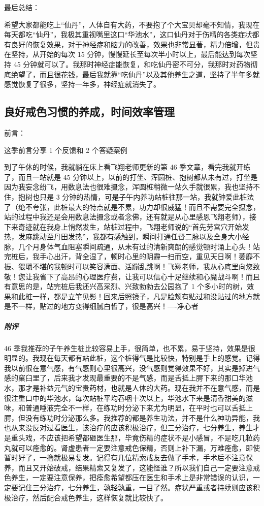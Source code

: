 最后总结：

希望大家都能吃上“仙丹”，人体自有大药，不要抱了个大宝贝却毫不知情，我现在每天都吃“仙丹”，我极其重视嘴里这口“华池水”，这口仙丹对于伤精的各类症状都有良好的恢复效果，对于神经症和脑力的改善，效果也非常显著，精力倍增，但贵在坚持，从开始的每次 15 分钟，慢慢延长至每次半小时以上，最后能达到每次坚持 45 分钟就可以了。我那时神经症能恢复，和吃仙丹密不可分，我那时对药物彻底绝望了，而且很花钱，最后我就靠“吃仙丹”以及其他养生之道，坚持了半年多就感觉恢复了很多，坚持一年多，神经症就消失了。

\subsection{良好戒色习惯的养成，时间效率管理}

前言：

这季前言分享 1 个反馈和 2 个答疑案例

\begin{case}
    到了午休的时候，我就躺在床上看飞翔老师更新的第 46 季文章，看完我就开练了，而且一站就是 45 分钟以上，以前的打坐、浑圆桩、抱树都从未有过，打坐是因为我妄念纷飞，用数息法也很难摄念，浑圆桩稍微一站久手就很累，我也坚持不住，抱树也只是 3 分钟的热情，可是子午内养功站桩往那一站，我就钟爱此桩法了（绝不夸张，此桩最大的特点就是不累，功力却很威猛！而且不需要完全摄念，站的过程中我还是会用数息法摄念或者念佛，还有就是从心里感恩飞翔老师），接下来奇迹就在我身上悄然发生，站桩过程中，飞翔老师说的“首先劳宫穴开始发热，发麻跳动至丹田发热”，我都有感触到，瞬间打通任督二脉以及全身大小经脉，几个月身体气血阻塞瞬间疏通，从未有过的清新爽朗的感觉顿时涌上心头！站完桩后，我手心出汗，背全湿了，顿时心里的阴霾一扫而空，重见天日啊！萎靡不振、猥琐不堪的我顿时可以笑容满面、活蹦乱跳啊！飞翔老师，我从心底里向您致敬！您让我省下了高昂的心理医疗费，让我可以信心十足继续和心魔战斗啊！而且有意思的是，站完桩后我还兴高采烈、兴致勃勃去公园抱了 1 个多小时的树，效果和此桩一样，都是立竿见影！回来后照镜子，凡是脸颊有贴过和没贴过的地方就是不一样，贴过的地方变得细腻白皙了，很是高兴！----净心者
    \subparagraph{附评} 46 季我推荐的子午养生桩比较容易上手，很简单，也不累，易于坚持，效果是很明显的。我现在每天都有站此桩，这个桩得气是比较快，特别是手上的感觉。记得我以前很在意气感，有气感则心里很高兴，没气感则觉得效果不好，其实是掉进气感的窠臼里了，后来我才发现最重要的不是气感，而是舌抵上腭下来的那口华池水，那才是补益元气的宝贵药材，也就是人体的大药。现在我并不在意气感，而是很注重口中的华池水，每次站桩平均吞咽十次以上，华池水下来是清香甜美的滋味，和普通唾液完全不一样，在练功时分泌下来尤为明显，在平时也可以舌抵上腭，但没有练功时分泌那么多。我推荐的都是养生功法，并不是什么神功异能，我也从来没反对过看医生，该治疗的应该积极治疗，但三分治疗，七分养生，养生才是重头戏，不应该把希望都砸医生那，毕竟伤精的症状不是小感冒，不是吃几粒药丸就可以痊愈的。肾虚患者一定要注意戒色保精，否则上补下漏，万难痊愈，即使暂时好了，一撸就极易复发。记得有几位精索戒友去做了手术，手术后不注意保养，而且又开始破戒，结果精索又复发了，这能怪谁？所以我们自己一定要注意戒色养生，一定要注意保养，把痊愈希望都压在医生和手术上是非常错误的认识，一定要记住三分治疗，七分养生，孰轻孰重，一目了然。症状严重或者持续则应该积极治疗，然后配合戒色养生，这样恢复就比较快了。
\end{case}

